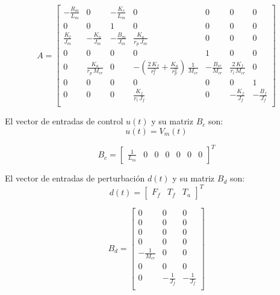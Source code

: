 \documentclass{article}
\begin{document}
\begin{equation}
A =
\begin{bmatrix}
-\frac{R_m}{L_m} & 0 & -\frac{K_e}{L_m} & 0 & 0 & 0 & 0 \\
0 & 0 & 1 & 0 & 0 & 0 & 0 \\
\frac{K_t}{J_m} & -\frac{K_a}{J_m} & -\frac{B_m}{J_m} & \frac{K_a}{r_p\, J_m} & 0 & 0 & 0 \\
0 & 0 & 0 & 0 & 1 & 0 & 0 \\
0 & \frac{K_a}{r_p \, M_{cr}} & 0 & -\left(\frac{2\, K_f}{r_l^2} + \frac{K_a}{r_p^2} \right)\, \frac{1}{M_{cr}} & -\frac{B_{cr}}{M_{cr}} & \frac{2\, K_f}{r_l \, M_{cr}} & 0 \\
0 & 0 & 0 & 0 & 0 & 0 & 1 \\
0 & 0 & 0 & \frac{K_f}{r_l\, J_f} & 0 & -\frac{K_f}{J_f} & -\frac{B_f}{J_f} \\
\end{bmatrix}
\end{equation}

El vector de entradas de control $u(t)$ y su matriz $B_c$ son:
\begin{equation}
u(t) = V_m(t)
\end{equation}

\begin{equation}
B_c =
\begin{bmatrix}
\frac{1}{L_m} &
0 &
0 &
0 &
0 &
0 &
0
\end{bmatrix}^T
\end{equation}

El vector de entradas de perturbación $d(t)$ y su matriz $B_d$ son:
\begin{equation*}
d(t) =
\begin{bmatrix}
F_f & T_f & T_a
\end{bmatrix}^T
\end{equation*}

\begin{equation}
B_d =
\begin{bmatrix}
0 & 0 & 0 \\
0 & 0 & 0 \\
0 & 0 & 0 \\
0 & 0 & 0 \\
-\frac{1}{M_{cr}} & 0 & 0 \\
0 & 0 & 0 \\
0 & -\frac{1}{J_f} & -\frac{1}{J_f} \\
\end{bmatrix}
\end{equation}
\end{document}
